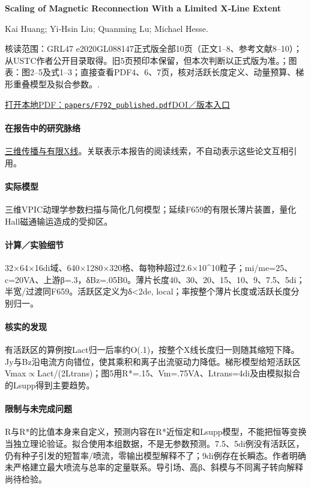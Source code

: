 \documentclass[UTF8,a4paper,11pt,openany,fontset=fandol]{ctexbook}
\begin{document}
\textbf{Scaling of Magnetic Reconnection With a Limited X‐Line Extent}\citep{F792}\

Kai Huang;  Yi‐Hsin Liu;  Quanming Lu;  Michael Hesse.

\textsf{核读范围：}GRL47 e2020GL088147正式版全部10页（正文1–8、参考文献8–10）；从USTC作者公开目录取得。旧5页预印本保留，但本次判断以正式版为准。；\textsf{图表：}图2–5及式1–3；直接查看PDF4、6、7页，核对活跃长度定义、动量预算、梯形重叠模型及拟合参数。.

\href{run:../papers/F792_published.pdf}{打开本地PDF：\texttt{papers/F792\_published.pdf}}\quad\href{https://doi.org/10.1029/2020gl088147}{DOI／版本入口}

\paragraph{在报告中的研究脉络}\hyperref[story:three]{三维传播与有限X线}。关联表示本报告的阅读线索，不自动表示这些论文互相引用。

\paragraph{实际模型}三维VPIC动理学参数扫描与简化几何模型；延续F659的有限长薄片装置，量化Hall磁通输运造成的受抑区。

\paragraph{计算／实验细节}32×64×16di域、640×1280×320格、每物种超过2.6×10\textasciicircum{}10粒子；mi/me=25、c=20VA、上游β=.3，δBz=.05B0。薄片长度40、30、20、15、10、9、7.5、5di；半宽/过渡同F659。活跃区定义为δ<2de, local；率按整个薄片长度或活跃长度分别归一。

\paragraph{核实的发现}有活跃区的算例按Lact归一后率约O(.1)，按整个X线长度归一则随其缩短下降。Jy与Bz沿电流方向错位，使其乘积和离子出流驱动力降低。梯形模型给短活跃区Vmax\ensuremath{\propto}Lact/(2Ltrans)；图5用R*=.15、Vm=.75VA、Ltrans=4di及由模拟拟合的Lsupp得到主要趋势。

\paragraph{限制与未完成问题}R与R*的比值本身来自定义，预测内容在R*近恒定和Lsupp模型，不能把恒等变换当独立理论验证。拟合使用本组数据，不是无参数预测。7.5、5di例没有活跃区，仍有种子引发的短暂率/喷流，零输出模型解释不了；9di例存在长瞬态。作者明确未严格建立最大喷流与总率的定量联系。导引场、高β、斜模与不同离子转向解释尚待检验。
\end{document}
